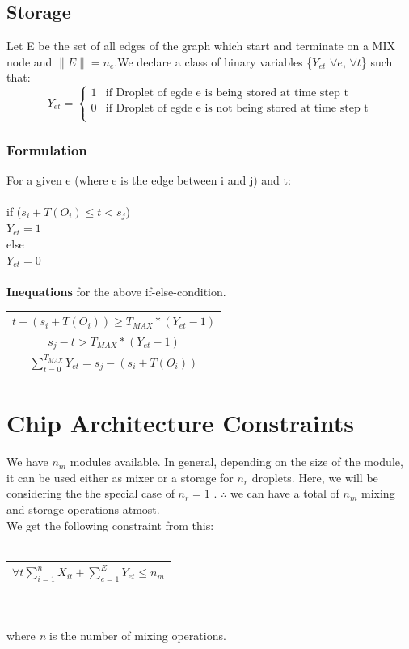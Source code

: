 \documentclass{article}
\begin{document}
\subsection{Storage}
Let E be the set of all edges of the graph which start and terminate on a MIX node and $\|E\|=n_e$.We declare a class of binary variables \{$Y_{et}$ $\forall e$, $\forall t$\} such that: \\

\begin{equation*}
  Y_{et} = \begin{cases}
  1  &  \text{if Droplet of egde e is being stored at time step t} \\
  0  &  \text{if Droplet of egde e is  not being stored at time step t} \\
  \end{cases}
\end{equation*}

\subsubsection{Formulation}
For a given e (where e is the edge between i and j) and t:\\\\
if ($s _i + T(O_i) \leq t < s_j$) \\
\indent $Y_{et} = 1$\\
else\\
\indent $Y_{et} = 0$\\
\\\noindent \textbf{Inequations} for the above if-else-condition.

\begin{center}
\begin{tabular}{|c|}
\hline
$t-(s_i + T(O_i)) \geq T_{MAX}*(Y_{et}-1)$\\
$s_j - t > T_{MAX}*(Y_{et}-1)$\\
$\sum\limits_{t=0}^{T_{MAX}}Y_{et}=s_j-(s_i + T(O_i))$\\
\hline
\end{tabular}
\end{center}

\section{Chip Architecture Constraints}
We have $n_m$ modules available. In general, depending on the size of the module, it can be used either as mixer or a storage for $n_r$ droplets. Here, we will be considering the the special case of $n_r = 1$ . $\therefore$ we can have a total of  $n_m$ mixing and storage operations atmost. \\
We get the following constraint from this:\\
\\
\begin{tabular}{|c|}
\hline
$\forall t \sum\limits_{i=1}^n X_{it} + \sum\limits_{e=1}^E Y_{et}\leq n_m$\\  
\hline
\end{tabular}
\\
\\
\noindent where \emph{n} is the number of mixing operations.
\end{document}
